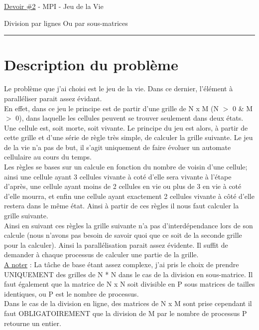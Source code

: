 \documentclass[10pt,a4paper]{article}
\begin{document}
\begin{center}
\begin{large}
\underline{Devoir \#2} - MPI - Jeu de la Vie \\
\vspace{0.25cm}
\begin{footnotesize}
Division par lignes Ou par sous-matrices \\
\end{footnotesize}
\noindent\rule{4cm}{0.4pt}
\end{large}
\end{center}

\section{Description du problème}

\indent Le problème que j'ai choisi est le jeu de la vie. Dans ce dernier, l'élément à paralléliser parait assez évidant. \\
En effet, dans ce jeu le principe est de partir d'une grille de N x M (N $>$ 0 \& M $>$ 0), dans laquelle les cellules peuvent se trouver seulement dans deux états. Une cellule est, soit morte, soit vivante. 
Le principe du jeu est alors, à partir de cette grille et d'une série de règle très simple, de calculer la grille suivante. 
Le jeu de la vie n'a pas de but, il s'agit uniquement de faire évoluer un automate cellulaire au cours du temps.\\

Les règles se bases sur un calcule en fonction du nombre de voisin d'une cellule; ainsi une cellule ayant 3 cellules vivante à coté d'elle sera vivante à l'étape d'après, une cellule ayant moins de 2 cellules en vie ou plus de 3 en vie à coté d'elle mourra, et enfin une cellule ayant exactement 2 cellules vivante à côté d'elle restera dans le même état. Ainsi à partir de ces règles il nous faut calculer la grille suivante. \\

Ainsi en suivant ces règles la grille suivante n'a pas d'interdépendance lors de son calcule (nous n'avons pas besoin de savoir quoi que ce soit de la seconde grille pour la calculer). Ainsi la parallélisation parait assez évidente. Il suffit de demander à chaque processus de calculer une partie de la grille. \\

\underline{A noter} : La tâche de base étant assez complexe, j'ai pris le choix de prendre UNIQUEMENT des grilles de N * N dans le cas de la division en sous-matrice. Il faut également que la matrice de N x N soit divisible en P sous matrices de tailles identiques, ou P est le nombre de processus.\\
Dans le cas de la division en ligne, des matrices de N x M sont prise cependant il faut OBLIGATOIREMENT que la division de M par le nombre de processus P retourne un entier. \\
\end{document}
